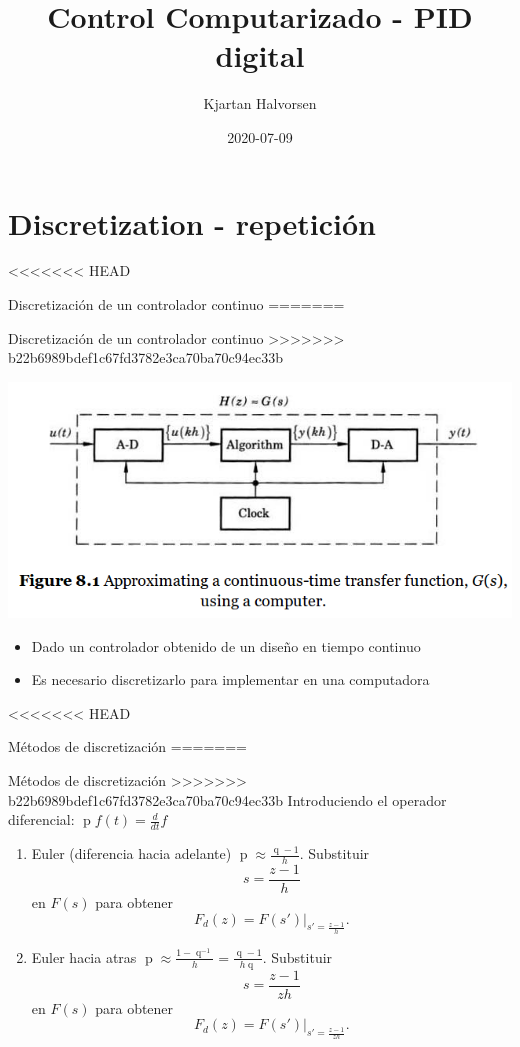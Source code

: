 \documentclass[presentation,aspectratio=1610]{beamer}
\author{Kjartan Halvorsen}
\date{2020-07-09}
\title{Control Computarizado - PID digital}
\DeclareMathOperator{\shift}{q}
\DeclareMathOperator{\diff}{p}
\begin{document}
\maketitle


\section{Discretization - repetición}
<<<<<<< HEAD
\label{sec:org39380f2}
\begin{frame}[label={sec:org86d23da}]{Discretización de un controlador continuo}
=======
\label{sec:orge119e86}
\begin{frame}[label={sec:org63bf691}]{Discretización de un controlador continuo}
>>>>>>> b22b6989bdef1c67fd3782e3ca70ba70c94ec33b
\begin{center}
\includegraphics[width=0.7\linewidth]{../../figures/fig8-1.png}
\end{center}

\begin{itemize}
\item Dado un controlador obtenido de un diseño en tiempo continuo
\item Es necesario discretizarlo para implementar en una computadora
\end{itemize}
\end{frame}

<<<<<<< HEAD
\begin{frame}[label={sec:org3ca2082}]{Métodos de discretización}
=======
\begin{frame}[label={sec:org35fc99d}]{Métodos de discretización}
>>>>>>> b22b6989bdef1c67fd3782e3ca70ba70c94ec33b
Introduciendo el operador diferencial:  \(\diff f(t) = \frac{d}{dt} f\)

\begin{enumerate}
\item Euler (diferencia hacia adelante) \(\diff \approx \frac{\shift -1}{h}\). Substituir
\[ s = \frac{z-1}{h} \] en \(F(s)\) para obtener
\[ F_d(z) = F(s')|_{s'=\frac{z-1}{h}}. \]
\item Euler hacia atras \(\diff \approx \frac{1 - \shift^{-1}}{h} = \frac{\shift -1}{h\shift}\). Substituir
\[ s = \frac{z-1}{zh} \] en \(F(s)\) para obtener
\[ F_d(z) = F(s')|_{s'=\frac{z-1}{zh}}. \]
\end{enumerate}
\end{frame}


\end{frame}
\end{frame}
\end{document}
